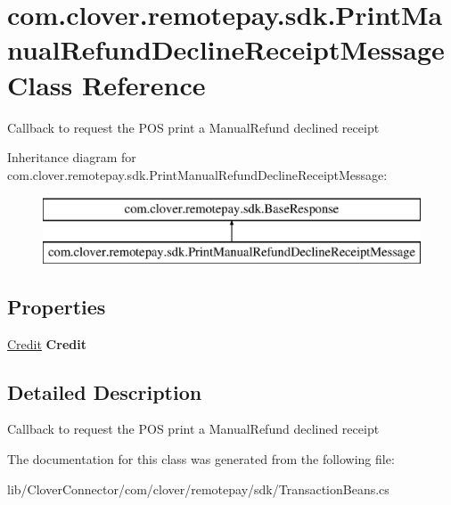 \hypertarget{classcom_1_1clover_1_1remotepay_1_1sdk_1_1_print_manual_refund_decline_receipt_message}{}\section{com.\+clover.\+remotepay.\+sdk.\+Print\+Manual\+Refund\+Decline\+Receipt\+Message Class Reference}
\label{classcom_1_1clover_1_1remotepay_1_1sdk_1_1_print_manual_refund_decline_receipt_message}


Callback to request the P\+OS print a Manual\+Refund declined receipt  


Inheritance diagram for com.\+clover.\+remotepay.\+sdk.\+Print\+Manual\+Refund\+Decline\+Receipt\+Message\+:\begin{figure}[H]
\begin{center}
\leavevmode
\includegraphics[height=2.000000cm]{classcom_1_1clover_1_1remotepay_1_1sdk_1_1_print_manual_refund_decline_receipt_message}
\end{center}
\end{figure}
\subsection*{Properties}
\begin{DoxyCompactItemize}
\item 
\mbox{\label{classcom_1_1clover_1_1remotepay_1_1sdk_1_1_print_manual_refund_decline_receipt_message_a4122dfe89edab079126b51c3b23c9568}} 
\hyperlink{classcom_1_1clover_1_1sdk_1_1v3_1_1payments_1_1_credit}{Credit} {\bfseries Credit}
\end{DoxyCompactItemize}


\subsection{Detailed Description}
Callback to request the P\+OS print a Manual\+Refund declined receipt 



The documentation for this class was generated from the following file\+:\begin{DoxyCompactItemize}
\item 
lib/\+Clover\+Connector/com/clover/remotepay/sdk/Transaction\+Beans.\+cs\end{DoxyCompactItemize}
